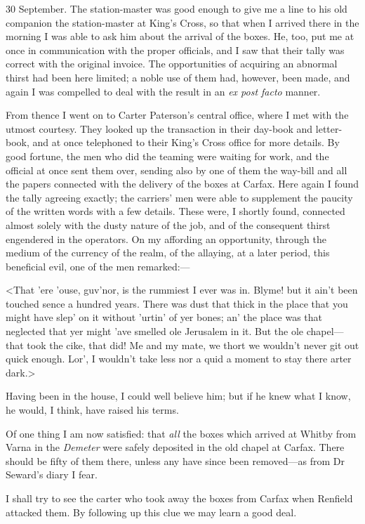 \begin{diary}{30 September.}
The station-master was good enough to give me a line to his old companion the station-master at King's Cross, so that when I arrived there in the morning I was able to ask him about the arrival of the boxes. He, too, put me at once in communication with the proper officials, and I saw that their tally was correct with the original invoice. The opportunities of acquiring an abnormal thirst had been here limited; a noble use of them had, however, been made, and again I was compelled to deal with the result in an \textit{ex post facto} manner.

From thence I went on to Carter Paterson's central office, where I met with the utmost courtesy. They looked up the transaction in their day-book and letter-book, and at once telephoned to their King's Cross office for more details. By good fortune, the men who did the teaming were waiting for work, and the official at once sent them over, sending also by one of them the way-bill and all the papers connected with the delivery of the boxes at Carfax. Here again I found the tally agreeing exactly; the carriers' men were able to supplement the paucity of the written words with a few details. These were, I shortly found, connected almost solely with the dusty nature of the job, and of the consequent thirst engendered in the operators. On my affording an opportunity, through the medium of the currency of the realm, of the allaying, at a later period, this beneficial evil, one of the men remarked:—

<That 'ere 'ouse, guv'nor, is the rummiest I ever was in. Blyme! but it ain't been touched sence a hundred years. There was dust that thick in the place that you might have slep' on it without 'urtin' of yer bones; an' the place was that neglected that yer might 'ave smelled ole Jerusalem in it. But the ole chapel—that took the cike, that did! Me and my mate, we thort we wouldn't never git out quick enough. Lor', I wouldn't take less nor a quid a moment to stay there arter dark.>

Having been in the house, I could well believe him; but if he knew what I know, he would, I think, have raised his terms.

Of one thing I am now satisfied: that \textit{all} the boxes which arrived at Whitby from Varna in the \textit{Demeter} were safely deposited in the old chapel at Carfax. There should be fifty of them there, unless any have since been removed—as from Dr Seward's diary I fear.

I shall try to see the carter who took away the boxes from Carfax when Renfield attacked them. By following up this clue we may learn a good deal.
\end{diary}
 

